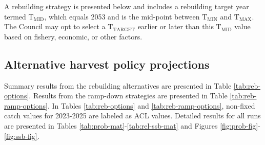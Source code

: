 \documentclass[11pt,
  english,
  letterpaper,
]{article}
\begin{document}

A rebuilding strategy is presented below and includes a rebuilding target year termed {\(\text{T}_\text{MID}\)\leavevmode\tagmcend\tagstructend}, which equals 2053 and is the mid-point between {\(\text{T}_\text{MIN}\)\leavevmode\tagmcend\tagstructend} and {\(\text{T}_\text{MAX}\)\leavevmode\tagmcend\tagstructend}. The Council may opt to select a {\(\text{T}_\text{TARGET}\)\leavevmode\tagmcend\tagstructend} earlier or later than this {\(\text{T}_\text{MID}\)\leavevmode\tagmcend\tagstructend} value based on fishery, economic, or other factors.

\leavevmode\tagmcend\tagstructend\par


\hypertarget{alternative-harvest-policy-projections}{%
\subsection{Alternative harvest policy projections}\label{alternative-harvest-policy-projections}}

\leavevmode\tagmcend\tagstructend


Summary results from the rebuilding alternatives are presented in Table \ref{tab:reb-options}. Results from the ramp-down strategies are presented in Table \ref{tab:reb-ramp-options}. In Tables \ref{tab:reb-options} and \ref{tab:reb-ramp-options}, non-fixed catch values for 2023-2025 are labeled as ACL values. Detailed results for all runs are presented in Tables \ref{tab:prob-mat}-\ref{tab:rel-ssb-mat} and Figures \ref{fig:prob-fig}-\ref{fig:ssb-fig}.

\leavevmode\tagmcend\tagstructend\par

\end{document}
